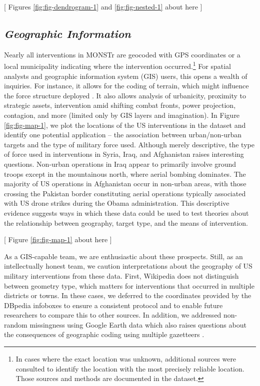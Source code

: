 \documentclass[fleqn,12pt]{article}
\begin{document}
\begin{center}
	[ Figures \ref{fig:fig-dendrogram-1} and \ref{fig:fig-nested-1} about here ]
\end{center}

\subsection*{\textit{Geographic Information}}
Nearly all interventions in MONSTr are geocoded with GPS coordinates or a local municipality indicating where the intervention occurred.\footnote{In cases where the exact location was unknown, additional sources were consulted to identify the location with the most precisely reliable location. Those sources and methods are documented in the dataset.} For spatial analysts and geographic information system (GIS) users, this opens a wealth of inquiries. For instance, it allows for the coding of terrain, which might influence the force structure deployed \citep{gleditsch_richardsoninformationage_2012, shaver_terrainruggednessland_2019}. It also allows analysis of urbanicity, proximity to strategic assets, intervention amid shifting combat fronts, power projection, contagion, and more (limited only by GIS layers and imagination). In Figure \ref{fig:fig-map-1}, we plot the locations of the US interventions in the dataset and identify one potential application -- the association between urban/non-urban targets and the type of military force used. Although merely descriptive, the type of force used in interventions in Syria, Iraq, and Afghanistan raises interesting questions. Non-urban operations in Iraq appear to primarily involve ground troops except in the mountainous north, where aerial bombing dominates. The majority of US operations in Afghanistan occur in non-urban areas, with those crossing the Pakistan border constituting aerial operations typically associated with US drone strikes during the Obama administration. This descriptive evidence suggests ways in which these data could be used to test theories about the relationship between geography, target type, and the means of intervention.

\begin{center}
	[ Figure \ref{fig:fig-map-1} about here ]    
\end{center}

As a GIS-capable team, we are enthusiastic about these prospects. Still, as an intellectually honest team, we caution interpretations about the geography of US military interventions from these data. First, Wikipedia does not distinguish between geometry type, which matters for interventions that occurred in multiple districts or towns. In these cases, we deferred to the coordinates provided by the DBpedia infoboxes to ensure a consistent protocol and to enable future researchers to compare this to other sources. In addition, we addressed non-random missingness using Google Earth data which also raises questions about the consequences of geographic coding using multiple gazetteers \citep{douglass_measuringlandscapecivil_2018}.
\end{document}
